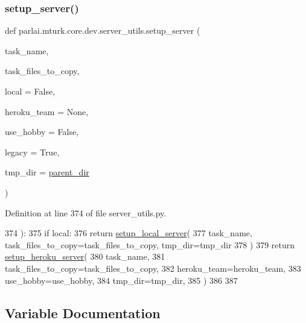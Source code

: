 \subsubsection{\texorpdfstring{setup\+\_\+server()}{setup\_server()}}
{\footnotesize\ttfamily def parlai.\+mturk.\+core.\+dev.\+server\+\_\+utils.\+setup\+\_\+server (\begin{DoxyParamCaption}\item[{}]{task\+\_\+name,  }\item[{}]{task\+\_\+files\+\_\+to\+\_\+copy,  }\item[{}]{local = {\ttfamily False},  }\item[{}]{heroku\+\_\+team = {\ttfamily None},  }\item[{}]{use\+\_\+hobby = {\ttfamily False},  }\item[{}]{legacy = {\ttfamily True},  }\item[{}]{tmp\+\_\+dir = {\ttfamily \hyperlink{namespaceparlai_1_1mturk_1_1core_1_1dev_1_1server__utils_a432ae14c0d872fbfebe4d9b7d73d13b9}{parent\+\_\+dir}} }\end{DoxyParamCaption})}



Definition at line 374 of file server\+\_\+utils.\+py.


\begin{DoxyCode}
374 ):
375     \textcolor{keywordflow}{if} local:
376         \textcolor{keywordflow}{return} \hyperlink{namespaceparlai_1_1mturk_1_1core_1_1server__utils_a9d4c4937ea60bd74630a44739e825ebf}{setup\_local\_server}(
377             task\_name, task\_files\_to\_copy=task\_files\_to\_copy, tmp\_dir=tmp\_dir
378         )
379     \textcolor{keywordflow}{return} \hyperlink{namespaceparlai_1_1mturk_1_1core_1_1server__utils_af1c97e9b93a403e200ac75b87a51c3c1}{setup\_heroku\_server}(
380         task\_name,
381         task\_files\_to\_copy=task\_files\_to\_copy,
382         heroku\_team=heroku\_team,
383         use\_hobby=use\_hobby,
384         tmp\_dir=tmp\_dir,
385     )
386 
387 
\end{DoxyCode}


\subsection{Variable Documentation}
\mbox{\label{namespaceparlai_1_1mturk_1_1core_1_1dev_1_1server__utils_aba21b4850601de4b9921fbf9c5203f92}} 
